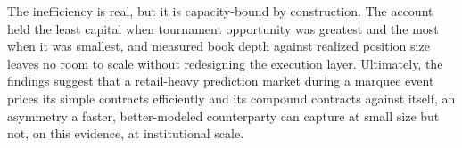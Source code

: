 \documentclass[12pt]{article}
\begin{document}
The inefficiency is real, but it is capacity-bound by construction. The account
held the least capital when tournament opportunity was greatest and the most when
it was smallest, and measured book depth against realized position size leaves no
room to scale without redesigning the execution layer. Ultimately, the findings
suggest that a retail-heavy prediction market during a marquee event prices its
simple contracts efficiently and its compound contracts against itself, an
asymmetry a faster, better-modeled counterparty can capture at small size but
not, on this evidence, at institutional scale.
\end{document}
